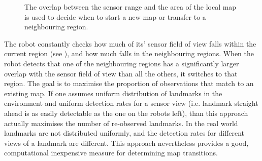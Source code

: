 \begin{figure}
\begin{center}
\quad \quad \quad
{}\quad
{}
\end{center}
\caption{The overlap between the sensor range and the area of the local 
         map is used to decide when to start a new map or transfer to a 
         neighbouring region.}
\label{fig:StartNew}
\end{figure}

The robot constantly checks how much of its' sensor field of view
falls within the current region (see ), and
how much falls in the neighbouring regions. When the robot detects
that one of the neighbouring regions has a significantly larger
overlap with the sensor field of view than all the others, it switches
to that region. The goal is to maximise the proportion of observations
that match to an existing map. If one assumes uniform distribution of
landmarks in the environment and uniform detection rates for a sensor
view (i.e. landmark straight ahead is as easily detectable as the one
on the robots left), than this approach actually maximises the number
of re-observed landmarks. In the real world landmarks are not
distributed uniformly, and the detection rates for different views of
a landmark are different. This approach nevertheless provides a good,
computational inexpensive measure for determining map transitions.

